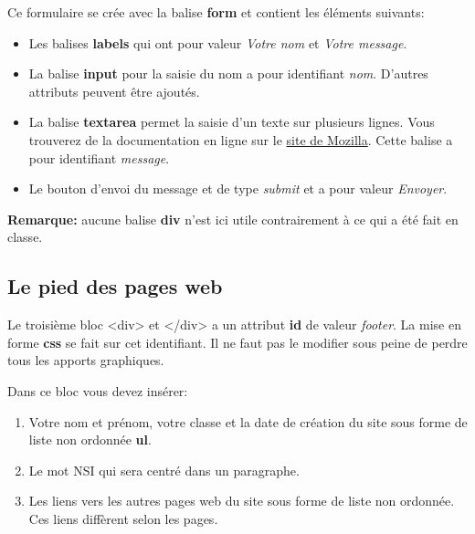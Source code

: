 \documentclass[11pt]{article}
\providecommand{\tightlist}{%
      \setlength{\itemsep}{0pt}\setlength{\parskip}{0pt}}
\begin{document}
\begin{itemize}
  Ce formulaire se crée avec la balise \textbf{form} et contient les
  éléments suivants:

  \begin{itemize}
  \tightlist
  \item
    Les balises \textbf{labels} qui ont pour valeur \emph{Votre nom} et
    \emph{Votre message}.
  \item
    La balise \textbf{input} pour la saisie du nom a pour identifiant
    \emph{nom}. D'autres attributs peuvent être ajoutés.
  \item
    La balise \textbf{textarea} permet la saisie d'un texte sur
    plusieurs lignes. Vous trouverez de la documentation en ligne sur le
    \href{https://developer.mozilla.org/fr/docs/Web/HTML/Element/Textarea}{site
    de Mozilla}. Cette balise a pour identifiant \emph{message}.
  \item
    Le bouton d'envoi du message et de type \emph{submit} et a pour
    valeur \emph{Envoyer}.
  \end{itemize}

  \textbf{Remarque:} aucune balise \textbf{div} n'est ici utile
  contrairement à ce qui a été fait en classe.
\end{itemize}

\hypertarget{le-pied-des-pages-web}{%
\subsection{Le pied des pages web}\label{le-pied-des-pages-web}}

Le troisième bloc \textless div\textgreater{} et
\textless/div\textgreater{} a un attribut \textbf{id} de valeur
\emph{footer}. La mise en forme \textbf{css} se fait sur cet
identifiant. Il ne faut pas le modifier sous peine de perdre tous les
apports graphiques.

Dans ce bloc vous devez insérer:

\begin{enumerate}
\def\labelenumi{\arabic{enumi}.}
\tightlist
\item
  Votre nom et prénom, votre classe et la date de création du site sous
  forme de liste non ordonnée \textbf{ul}.
\item
  Le mot NSI qui sera centré dans un paragraphe.
\item
  Les liens vers les autres pages web du site sous forme de liste non
  ordonnée. Ces liens diffèrent selon les pages.
\end{enumerate}
\end{document}
